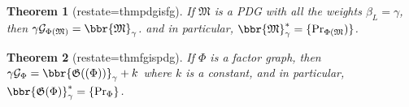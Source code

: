 \documentclass{article}
\theoremstyle{plain}
\newtheorem{theorem}{Theorem}[section]
\theoremstyle{definition}
\theoremstyle{remark}
\newcommand{\thickD}{I\mkern-8muD}
\newcommand{\kldiv}{\thickD\infdivx}%
\newcommand{\V}{\mathcal V}
\newcommand{\dg}[1]{\mathfrak{#1}}
\newcommand{\PDGof}[1]{\dg G(#1)}
\numberwithin{equation}{section}
\begin{document}
\begin{theorem}[restate=thmpdgisfg]\label{thm:pdg-is-fg}
%
%
If $\dg M$ is a PDG with all the weights $\beta_L = \gamma$, then
    $\gamma \mathcal G_{\Phi(\dg M)} = \bbr{\dg M}_{\gamma}$.
and in particular,
$\bbr{\dg M}_{\gamma}^* = \{\Pr_{\Phi({\dg M}}) \}$. 
\end{theorem}
\begin{theorem}[restate=thmfgispdg]\label{thm:fg-is-pdg}
	If $\Phi$ is a factor graph, then
	$\gamma \mathcal G_\Phi = \bbr{\PDGof{(\Phi)}}_{\gamma} + k$ where $k$ is a constant, and in particular,
        $\bbr{\PDGof{\Phi}}_{\gamma}^* = \{\Pr_{\Phi} \}$. 
\end{theorem}

\end{document}
